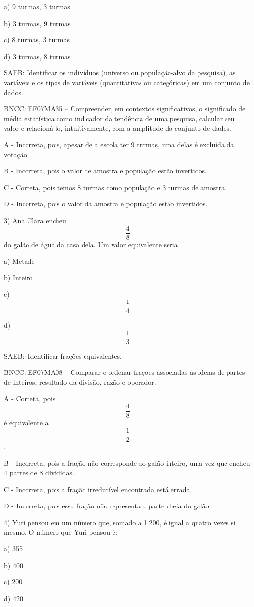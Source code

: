 a) 9 turmas, 3 turmas

b) 3 turmas, 9 turmas

c) 8 turmas, 3 turmas

d) 3 turmas, 8 turmas

SAEB: Identificar os indivíduos (universo ou população-alvo da
pesquisa), as variáveis e os tipos de variáveis (quantitativas ou
categóricas) em um conjunto de dados.

BNCC: EF07MA35 -- Compreender, em contextos significativos, o
significado de média estatística como indicador da tendência de uma
pesquisa, calcular seu valor e relacioná-lo, intuitivamente, com a
amplitude do conjunto de dados.

A - Incorreta, pois, apesar de a escola ter 9 turmas, uma delas é
excluída da votação.

B - Incorreta, pois o valor de amostra e população estão invertidos.

C - Correta, pois temos 8 turmas como população e 3 turmas de amostra.

D - Incorreta, pois o valor da amostra e população estão invertidos.

3) Ana Clara encheu \[\frac{4}{8}\] do galão de água da casa dela. Um
valor equivalente seria

a) Metade

b) Inteiro

c) \[\frac{1}{4}\]

d) \[\frac{1}{3}\]

SAEB:~Identificar frações equivalentes.

BNCC: EF07MA08 -- Comparar e ordenar frações associadas às ideias de
partes de inteiros, resultado da divisão, razão e operador.

A - Correta, pois \[\frac{4}{8}\] é equivalente a \[\frac{1}{2}\].

B - Incorreta, pois a fração não corresponde ao galão inteiro, uma vez
que encheu 4 partes de 8 divididas.

C - Incorreta, pois a fração irredutível encontrada está errada.

D - Incorreta, pois essa fração não representa a parte cheia do galão.

4) Yuri pensou em um número que, somado a 1.200, é igual a quatro vezes
si mesmo. O número que Yuri pensou é:

a) 355

b) 400

c) 200

d) 420

